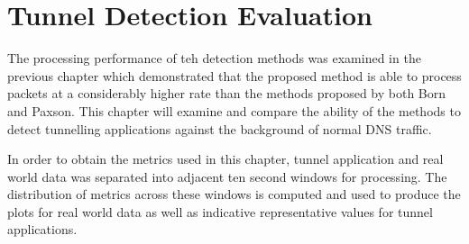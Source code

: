 \documentclass[12pt]{report}
\theoremstyle{remark}
\theoremstyle{definition}
\theoremstyle{definition}
\theoremstyle{definition}
\begin{document}
\chapter{Tunnel Detection Evaluation}
\label{chap-evaluation}
\label{tunnel-detection-performance}

The processing performance of teh detection methods was examined in the previous
chapter which demonstrated that the proposed method is able to process packets
at a considerably higher rate than the methods proposed by both Born and Paxson.
This chapter will examine and compare the ability of the methods to detect
tunnelling applications against the background of normal DNS traffic.

In order to obtain the metrics used in this chapter, tunnel application and real
world data was separated into adjacent ten second windows for processing. The
distribution of metrics across these windows is computed and used to produce the
plots for real world data as well as indicative representative values for tunnel
applications.
\end{document}
